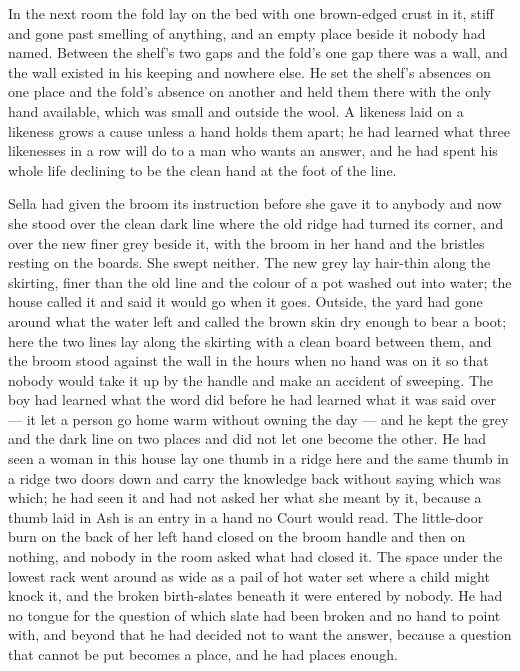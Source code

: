 In the next room the fold lay on the bed with one brown-edged crust in it, stiff and gone past smelling of anything, and an empty place beside it nobody had named. Between the shelf's two gaps and the fold's one gap there was a wall, and the wall existed in his keeping and nowhere else. He set the shelf's absences on one place and the fold's absence on another and held them there with the only hand available, which was small and outside the wool. A likeness laid on a likeness grows a cause unless a hand holds them apart; he had learned what three likenesses in a row will do to a man who wants an answer, and he had spent his whole life declining to be the clean hand at the foot of the line.

\scenebreak

Sella had given the broom its instruction before she gave it to anybody and now she stood over the clean dark line where the old  ridge had turned its corner, and over the new finer grey beside it, with the broom in her hand and the bristles resting on the boards. She swept neither. The new grey lay hair-thin along the skirting, finer than the old line and the colour of a pot washed out into water; the house called it  and said it would go when it goes. Outside, the yard had gone around what the water left and called the brown skin dry enough to bear a boot; here the two lines lay along the skirting with a clean board between them, and the broom stood against the wall in the hours when no hand was on it so that nobody would take it up by the handle and make an accident of sweeping. The boy had learned what the word did before he had learned what it was said over --- it let a person go home warm without owning the day --- and he kept the grey and the dark line on two places and did not let one become the other. He had seen a woman in this house lay one thumb in a ridge here and the same thumb in a ridge two doors down and carry the knowledge back without saying which was which; he had seen it and had not asked her what she meant by it, because a thumb laid in Ash is an entry in a hand no Court would read. The little-door burn on the back of her left hand closed on the broom handle and then on nothing, and nobody in the room asked what had closed it. The space under the lowest rack went around as wide as a pail of hot water set where a child might knock it, and the broken birth-slates beneath it were entered by nobody. He had no tongue for the question of which slate had been broken and no hand to point with, and beyond that he had decided not to want the answer, because a question that cannot be put becomes a place, and he had places enough.

